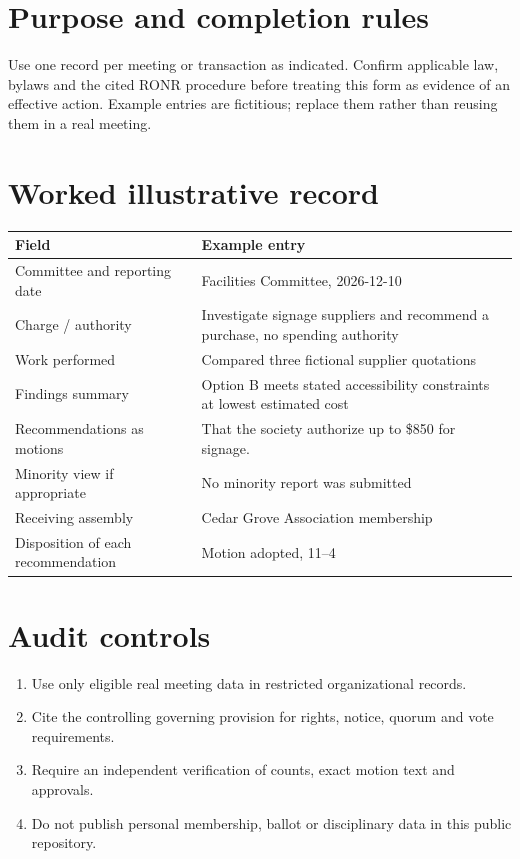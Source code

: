 \documentclass[11pt]{article}
\begin{document}
\SuiteOpen
\section{Purpose and completion rules}
Use one record per meeting or transaction as indicated. Confirm applicable law, bylaws and the cited RONR procedure before treating this form as evidence of an effective action. Example entries are fictitious; replace them rather than reusing them in a real meeting.

\section{Worked illustrative record}
\begin{longtable}{@{}p{.38\linewidth}p{.55\linewidth}@{}}\toprule Field & Example entry\\\midrule\endhead


Committee and reporting date & Facilities Committee, 2026-12-10\\
Charge / authority & Investigate signage suppliers and recommend a purchase, no spending authority\\
Work performed & Compared three fictional supplier quotations\\
Findings summary & Option B meets stated accessibility constraints at lowest estimated cost\\
Recommendations as motions & That the society authorize up to \$850 for signage.\\
Minority view if appropriate & No minority report was submitted\\
Receiving assembly & Cedar Grove Association membership\\
Disposition of each recommendation & Motion adopted, 11–4\\
\bottomrule\end{longtable}
\section{Audit controls}
\begin{enumerate}[leftmargin=*,itemsep=4pt]
\item Use only eligible real meeting data in restricted organizational records.
\item Cite the controlling governing provision for rights, notice, quorum and vote requirements.
\item Require an independent verification of counts, exact motion text and approvals.
\item Do not publish personal membership, ballot or disciplinary data in this public repository.
\end{enumerate}
\end{document}
